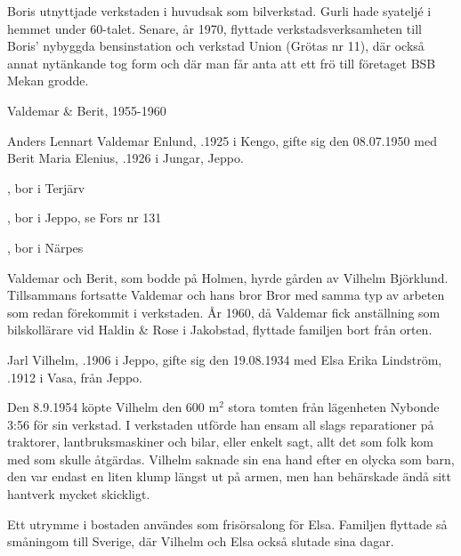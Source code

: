 Boris utnyttjade verkstaden i huvudsak som bilverkstad. Gurli hade syateljé i hemmet under 60-talet. Senare, år 1970, flyttade verkstadsverksamheten till Boris' nybyggda bensinstation och verkstad Union (Grötas nr 11), där också annat nytänkande tog form och där man får anta att ett frö till företaget BSB Mekan grodde.



 Valdemar \& Berit, 1955-1960

Anders Lennart Valdemar Enlund, .1925 i Kengo, gifte sig den 08.07.1950 med Berit Maria Elenius, .1926 i Jungar, Jeppo.
\begin{jhchildren}
  \item {}, bor i Terjärv
  \item {}, bor i Jeppo, se Fors nr 131
  \item {}, bor i Närpes
\end{jhchildren}
Valdemar och Berit, som bodde på Holmen, hyrde gården av Vilhelm 	Björklund. Tillsammans fortsatte Valdemar och hans bror Bror med samma typ av arbeten som redan förekommit i verkstaden. År 1960, då Valdemar fick anställning som bilskollärare vid Haldin \& Rose i Jakobstad, flyttade familjen bort från orten.


Jarl Vilhelm, .1906 i Jeppo, gifte sig den 19.08.1934 med Elsa Erika Lindström, .1912 i Vasa, från Jeppo.
\begin{jhchildren}
  \item {}
  \item {}
\end{jhchildren}

Den 8.9.1954 köpte Vilhelm den 600 m$^2$ stora tomten från lägenheten Nybonde 3:56 för sin verkstad. I verkstaden utförde han ensam all slags reparationer på traktorer, lantbruksmaskiner och bilar, eller enkelt sagt, allt det som folk kom med som skulle åtgärdas. Vilhelm saknade sin ena hand efter en olycka som barn, den var endast en liten klump längst ut på armen, men han behärskade ändå sitt hantverk mycket skickligt.

Ett utrymme i bostaden användes som frisörsalong för Elsa. Familjen flyttade så småningom till Sverige, där Vilhelm och Elsa också slutade sina dagar.

